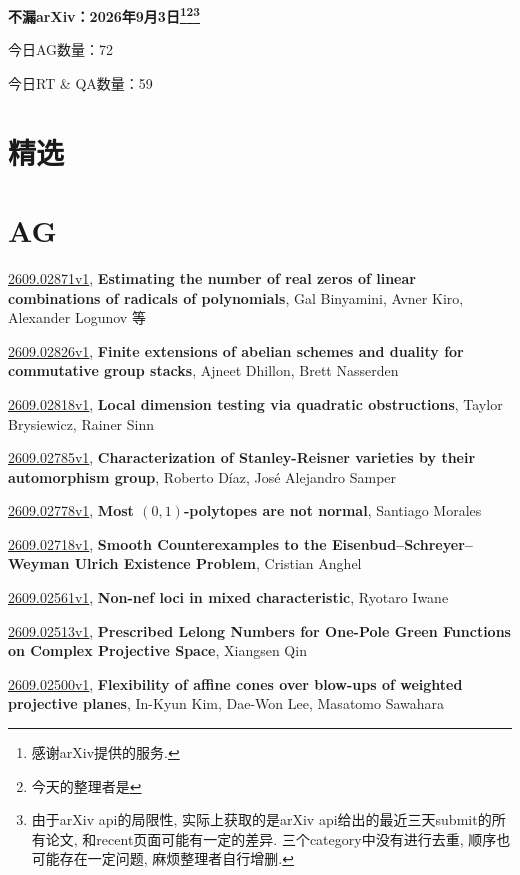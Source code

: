\documentclass[9pt, a4paper]{article}
\theoremstyle{plain}
\theoremstyle{definition}
\theoremstyle{remark}
\newcommand{\arxiv}[3]{\href{https://arxiv.org/abs/#1}{#1}, \textbf{\textcolor{arxivblue}{#2}}, #3}
\newcommand{\AGnumber}{72}
\newcommand{\RTQAnumber}{59}
\newcommand{\NewestDate}{2026年9月3日}
\newcommand{\todayarXiver}{} %
\begin{document}
\begin{center}
    \Huge\textbf{不漏arXiv：\NewestDate\footnote{感谢arXiv提供的服务.}\footnote{今天的整理者是\todayarXiver}\footnote{由于arXiv api的局限性, 实际上获取的是arXiv api给出的最近三天submit的所有论文, 和recent页面可能有一定的差异. 三个category中没有进行去重, 顺序也可能存在一定问题, 麻烦整理者自行增删.}} \\
\end{center}

\setcounter{section}{-1}

\begin{center}
    今日AG数量：\AGnumber
    
    今日RT \& QA数量：\RTQAnumber
    
\end{center}


\section{精选}


\section{AG}
\arxiv{2609.02871v1}{Estimating the number of real zeros of linear combinations of radicals of polynomials}{Gal Binyamini, Avner Kiro, Alexander Logunov 等}

\arxiv{2609.02826v1}{Finite extensions of abelian schemes and duality for commutative group stacks}{Ajneet Dhillon, Brett Nasserden}

\arxiv{2609.02818v1}{Local dimension testing via quadratic obstructions}{Taylor Brysiewicz, Rainer Sinn}

\arxiv{2609.02785v1}{Characterization of Stanley-Reisner varieties by their automorphism group}{Roberto Díaz, José Alejandro Samper}

\arxiv{2609.02778v1}{Most $(0,1)$-polytopes are not normal}{Santiago Morales}

\arxiv{2609.02718v1}{Smooth Counterexamples to the Eisenbud--Schreyer--Weyman Ulrich Existence Problem}{Cristian Anghel}

\arxiv{2609.02561v1}{Non-nef loci in mixed characteristic}{Ryotaro Iwane}

\arxiv{2609.02513v1}{Prescribed Lelong Numbers for One-Pole Green Functions on Complex Projective Space}{Xiangsen Qin}

\arxiv{2609.02500v1}{Flexibility of affine cones over blow-ups of weighted projective planes}{In-Kyun Kim, Dae-Won Lee, Masatomo Sawahara}
\end{document}
